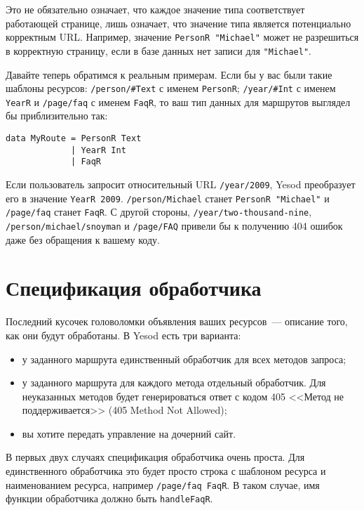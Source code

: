 \begin{remark}
  Это не обязательно означает, что каждое значение типа соответствует работающей странице,
  лишь означает, что значение типа является потенциально корректным URL. Например,
  значение \lstinline!PersonR "Michael"! может не разрешиться в корректную страницу, если
  в базе данных нет записи для \lstinline!"Michael"!.
\end{remark}

Давайте теперь обратимся к реальным примерам. Если бы у вас были такие
шаблоны ресурсов: \lstinline!/person/#Text! с именем
\lstinline!PersonR!; \lstinline!/year/#Int! с именем
\lstinline!YearR! и \lstinline!/page/faq! с именем \lstinline!FaqR!,
то ваш тип данных для маршрутов выглядел бы приблизительно так:
\begin{lstlisting}
data MyRoute = PersonR Text
             | YearR Int
             | FaqR
\end{lstlisting}

Если пользователь запросит относительный URL \lstinline!/year/2009!,
Yesod преобразует его в значение \lstinline!YearR 2009!.
\lstinline!/person/Michael! станет \lstinline!PersonR "Michael"!
и \lstinline!/page/faq! станет \lstinline!FaqR!. С другой
стороны, \lstinline!/year/two-thousand-nine!,
\lstinline!/person/michael/snoyman! и \lstinline!/page/FAQ! привели бы
к получению 404 ошибок даже без обращения к вашему коду.

\section{Спецификация обработчика}
Последний кусочек головоломки объявления ваших ресурсов~--- описание
того, как они будут обработаны. В Yesod есть три варианта:
\begin{itemize}
\item у заданного маршрута единственный обработчик для всех методов запроса;
\item у заданного маршрута для каждого метода отдельный
  обработчик. Для неуказанных методов будет генерироваться ответ с
  кодом 405 <<Метод не поддерживается>> (405 Method Not
  Allowed);
\item вы хотите передать управление на дочерний сайт.
\end{itemize}

В первых двух случаях спецификация обработчика очень проста. Для
единственного обработчика это будет просто строка с шаблоном ресурса и
наименованием ресурса, например \lstinline!/page/faq FaqR!. В таком
случае, имя функции обработчика должно быть \lstinline!handleFaqR!.

